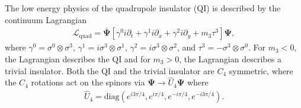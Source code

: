 \documentclass[%
 reprint,
 amsmath,amssymb,
 aps,
]{revtex4-1}
\begin{document}
\begin{appendix}
The low energy physics of the quadrupole insulator (QI) is described by the continuum Lagrangian 
\begin{equation}\begin{split}
\mathcal{L}_{\text{quad}} = \bar{\bm{\Psi}} [\gamma^0 i\partial_t + \gamma^1 i\partial_x + \gamma^2 i\partial_y + m_3\tau^3] \bm{\Psi},
\label{Aeq:QIContinuumLag}\end{split}\end{equation}
where $\gamma^0 = \sigma^0 \otimes \sigma^3$, $\gamma^1 = i \sigma^3 \otimes \sigma^1$, $\gamma^2 = i \sigma^3 \otimes \sigma^2$, and $\tau^3 = -\sigma^3\otimes \sigma^0$. For $m_3<0$, the Lagrangian describes the QI and for $m_3>0$, the Lagrangian describes a trivial insulator. Both the QI and the trivial insulator are $C_4$ symmetric, where the $C_4$ rotations act on the spinors via $\bm{\Psi} \rightarrow \hat{U}_4 \bm{\Psi}$ where
\begin{equation}\begin{split}
\hat{U}_4 = \text{diag}(e^{i3\pi/4},e^{i\pi/4},e^{-i\pi/4}, e^{-i3\pi/4}).
\label{Aeq:C4SpinorDef}\end{split}\end{equation} 



\end{appendix}
\end{document}
